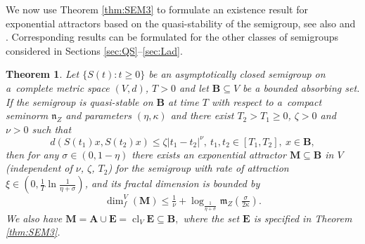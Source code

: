 \documentclass[a4paper,12pt,reqno]{amsart}
\theoremstyle{plain}
\newtheorem{thm}[lem]{Theorem}
\theoremstyle{definition}
\numberwithin{equation}{section}
\newcommand{\abs}[1]{\left\vert#1\right\vert}
\newcommand{\dimf}{\operatorname{dim}_{f}}
\newcommand{\cl}{\operatorname{cl}}
\renewcommand{\geq}{\geqslant}
\renewcommand{\leq}{\leqslant}
\begin{document}
We now use Theorem \ref{thm:SEM3} to formulate an existence result for exponential attractors based on the quasi-stability of the semigroup, see also \cite[Theorem 3.4]{sonner2012} and \cite[Theorem 3.4.7]{chueshov}. Corresponding results can be formulated for the other classes of semigroups considered in Sections \ref{sec:QS}--\ref{sec:Lad}.

\begin{thm}
Let $\{S(t)\colon t\geq 0\}$ be an asymptotically closed semigroup on a~complete metric space $(V,d)$, $T>0$ and let $\mathbf{B}\subseteq V$ be a bounded absorbing set. If the semigroup is quasi-stable on $\mathbf{B}$ at time $T$ with respect to a~compact seminorm $\mathfrak{n}_{Z}$ and parameters $(\eta,\kappa)$ and there exist $T_2>T_1\geq 0$, $\zeta>0$ and $\nu>0$ such that
\begin{equation*}
d(S(t_1)x,S(t_2)x)\leq\zeta\abs{t_1-t_2}^{\nu},\ t_1,t_2\in[T_1,T_2],\ x\in\mathbf{B},
\end{equation*}
then for any $\sigma\in(0,1-\eta)$ there exists an exponential attractor $\mathbf{M}\subseteq\mathbf{B}$ in $V$ (independent of $\nu$, $\zeta$, $T_2$) for the semigroup with rate of attraction $\xi\in(0,\frac{1}{T}\ln{\frac{1}{\eta+\sigma}})$, and its fractal dimension is bounded by
\begin{equation*}
\dimf^{V}(\mathbf{M})\leq\tfrac{1}{\nu}+\log_{\frac{1}{\eta+\sigma}}\mathfrak{m}_{Z}\left(\tfrac{\sigma}{2\kappa}\right).
\end{equation*}
We also have
$\mathbf{M}=\mathbf{A}\cup\mathbf{E}=\cl_{V}\mathbf{E}\subseteq\mathbf{B},$
where the set $\mathbf{E}$ is specified in Theorem \ref{thm:SEM3}. 
\end{thm}
\end{document}
